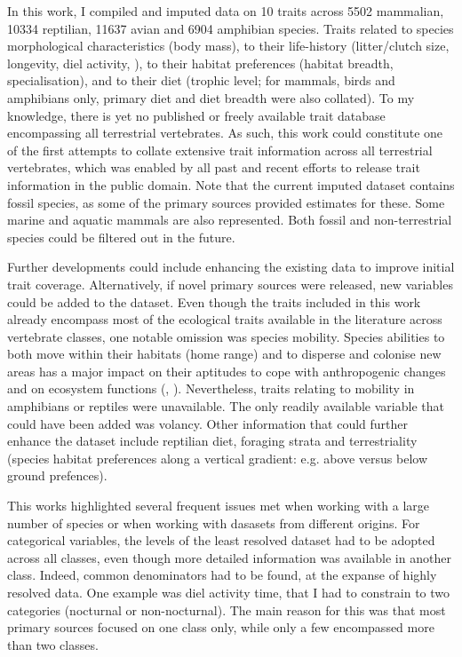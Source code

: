 In this work, I compiled and imputed data on 10 traits across 5502 mammalian, 10334 reptilian, 11637 avian and 6904 amphibian species. Traits related to species morphological characteristics (body mass), to their life-history (litter/clutch size, longevity, diel activity, ), to their habitat preferences (habitat breadth, specialisation), and to their diet (trophic level; for mammals, birds and amphibians only, primary diet and diet breadth were also collated). To my knowledge, there is yet no published or freely available trait database encompassing all terrestrial vertebrates. As such, this work could constitute one of the first attempts to collate extensive trait information across all terrestrial vertebrates, which was enabled by all past and recent efforts to release trait information in the public domain. Note that the current imputed dataset contains fossil species, as some of the primary sources provided estimates for these. Some marine and aquatic mammals are also represented. Both fossil and non-terrestrial species could be filtered out in the future.

Further developments could include enhancing the existing data to improve initial trait coverage. Alternatively, if novel primary sources were released, new variables could be added to the dataset. Even though the traits included in this work already encompass most of the ecological traits available in the literature across vertebrate classes, one notable omission was species mobility. Species abilities to both move within their habitats (home range) and to disperse and colonise new areas has a major impact on their aptitudes to cope with anthropogenic changes and on ecosystem functions (\cite{Tucker2018}, \cite{Schloss2012b}). Nevertheless, traits relating to mobility in amphibians or reptiles were unavailable. The only readily available variable that could have been added was volancy. Other  information that could further enhance the dataset include reptilian diet, foraging strata and terrestriality (species habitat preferences along a vertical gradient: e.g. above versus below ground prefences).

This works highlighted several frequent issues met when working with a large number of species or when working with dasasets from different origins. For categorical variables, the levels of the least resolved dataset had to be adopted across all classes, even though more detailed information was available in another class. Indeed, common denominators had to be found, at the expanse of highly resolved data. One example was diel activity time, that I had to constrain to two categories (nocturnal or non-nocturnal). The main reason for this was that most primary sources focused on one class only, while only a few encompassed more than two classes. 

